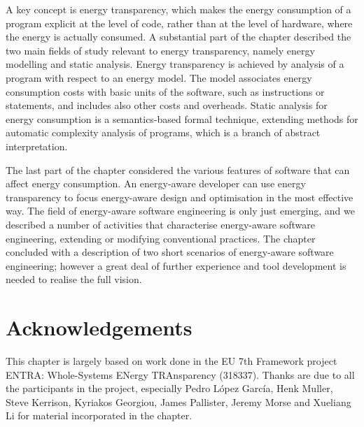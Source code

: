 \documentclass[oneside]{book}
\begin{document}
A key concept is energy transparency, which makes the energy consumption of a program explicit at the level of code, rather than at the
level of hardware, where the energy is actually consumed. A substantial part of the chapter described the two
main fields of study relevant to energy transparency, namely energy modelling and static analysis.
Energy transparency is achieved by analysis of a program with respect to
an energy model.  The model associates energy consumption costs with basic units of the software, such as instructions or statements, and
includes also other costs and overheads. Static analysis for energy consumption
 is a semantics-based formal technique, extending methods for automatic complexity analysis of programs,
which is a branch of abstract interpretation.

The last part of the chapter considered the various features of software that can affect energy consumption. An energy-aware developer 
can use energy transparency to focus energy-aware design and optimisation in the most effective way. The field of
energy-aware software engineering is only just emerging, and we described a number of activities that characterise
energy-aware software engineering, extending or modifying conventional practices. The chapter concluded with
a description of two short scenarios of energy-aware software engineering; however
a great deal of further experience and 
tool development is needed to realise the full vision.


\section*{Acknowledgements}

This chapter is largely based on work done in the EU 7th Framework project ENTRA: Whole-Systems ENergy TRAnsparency (318337).
Thanks are due to all the participants in the project, especially Pedro L\'{o}pez Garc\'{i}a, Henk Muller, Steve Kerrison, Kyriakos Georgiou, James Pallister, Jeremy Morse and Xueliang Li 
for material incorporated in the chapter.
\end{document}
